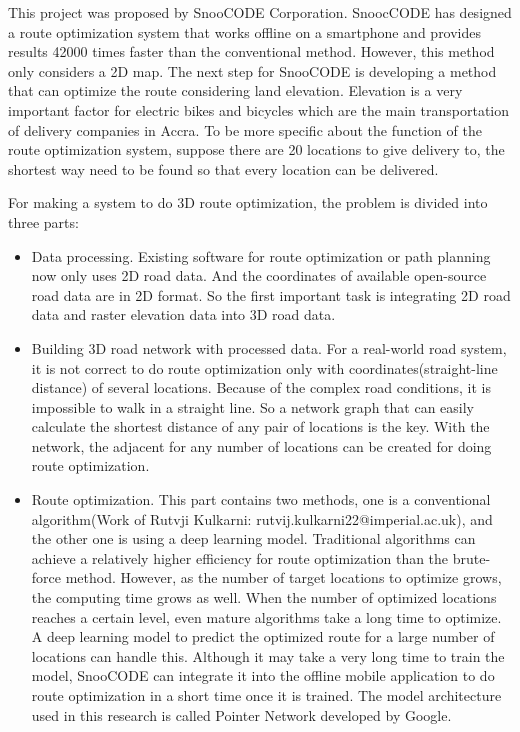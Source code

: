 \documentclass[final-report]{report-template}
\begin{document}
This project was proposed by SnooCODE Corporation. SnoocCODE has designed a route optimization system that works offline on a smartphone and provides 
results 42000 times faster than the conventional method. However, this method only considers a 2D map.
The next step for SnooCODE is developing a method that can optimize the route considering land elevation. 
Elevation is a very important factor for electric bikes and bicycles which are the main transportation of delivery companies in Accra.
To be more specific about the function of the route optimization system, suppose there are 20 locations to
give delivery to, the shortest way need to be found so that every location can be delivered. 

For making a system to do 3D route optimization, the problem is divided into three parts: 
\begin{itemize}
    \item Data processing. Existing software for route optimization or path planning now only uses 2D road data.
          And the coordinates of available open-source road data are in 2D format.
          So the first important task is integrating 2D road data and raster elevation data into 3D road data.
    \item Building 3D road network with processed data. 
          For a real-world road system, it is not correct to do route optimization only with coordinates(straight-line distance) of several locations.
          Because of the complex road conditions, it is impossible to walk in a straight line.
          So a network graph that can easily calculate the shortest distance of any pair of locations is the key.
          With the network, the adjacent for any number of locations can be created for doing route optimization.
    \item Route optimization. This part contains two methods, 
          one is a conventional algorithm(Work of Rutvji Kulkarni: rutvij.kulkarni22@imperial.ac.uk), 
          and the other one is using a deep learning model. 
          Traditional algorithms can achieve a relatively higher efficiency for route optimization than the brute-force method.
          However, as the number of target locations to optimize grows, the computing time grows as well.
          When the number of optimized locations reaches a certain level, even mature algorithms take a long time to optimize.
          A deep learning model to predict the optimized route for a large number of locations can handle this.
          Although it may take a very long time to train the model, 
          SnooCODE can integrate it into the offline mobile application to do route optimization in a short time once it is trained.
          The model architecture used in this research is called Pointer Network developed by Google.
\end{itemize}
\end{document}
